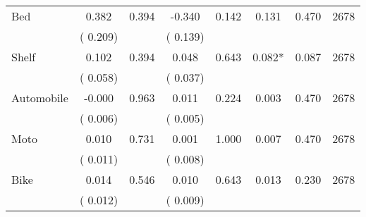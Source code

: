 \begin{tabular}{l*{7}{c}}
 Bed       &              0.382       &        0.394  &             -0.340       &        0.142  &              0.131       &              0.470 &  2678 \\ 
                       &       (       0.209)             &                               &       (       0.139)                     &                               &                                               &                                &                      \\ 

 Shelf       &              0.102       &        0.394  &              0.048       &        0.643  &              0.082*       &              0.087 &  2678 \\ 
                       &       (       0.058)             &                               &       (       0.037)                     &                               &                                               &                                &                      \\ 

 Automobile       &             -0.000       &        0.963  &              0.011       &        0.224  &              0.003       &              0.470 &  2678 \\ 
                       &       (       0.006)             &                               &       (       0.005)                     &                               &                                               &                                &                      \\ 

 Moto       &              0.010       &        0.731  &              0.001       &        1.000  &              0.007       &              0.470 &  2678 \\ 
                       &       (       0.011)             &                               &       (       0.008)                     &                               &                                               &                                &                      \\ 

 Bike       &              0.014       &        0.546  &              0.010       &        0.643  &              0.013       &              0.230 &  2678 \\ 
                       &       (       0.012)             &                               &       (       0.009)                     &                               &                                               &                                &                      \\ 


\end{tabular}
